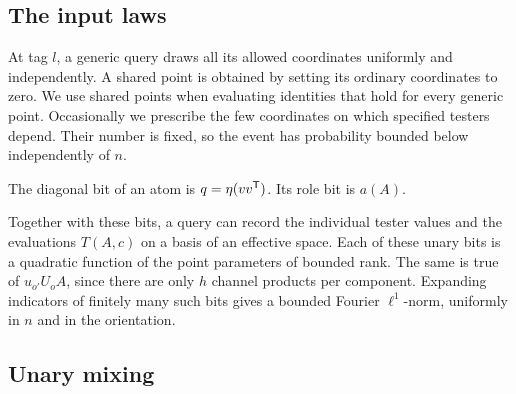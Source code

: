 \subsection{The input laws}

At tag \(l\), a generic query draws all its allowed coordinates
uniformly and independently. A shared point is obtained by setting its
ordinary coordinates to zero. We use shared points when evaluating
identities that hold for every generic point. Occasionally we prescribe
the few coordinates on which specified testers depend. Their number is
fixed, so the event has probability bounded below independently of \(n\).

The diagonal bit of an atom is \(q=\eta(vv^{\mathsf T})\). Its role bit is
\(a(A)\).

Together with these bits, a query can record the individual
tester values and the evaluations \(T(A,c)\) on a basis of an effective
space. Each of these unary bits is a quadratic function of the point
parameters of bounded rank. The same is true of \(u_{o'}U_oA\), since
there are only \(h\) channel products per component. Expanding indicators
of finitely many such bits gives a bounded Fourier \(\ell^1\)-norm,
uniformly in \(n\) and in the orientation.

\subsection{Unary mixing}

